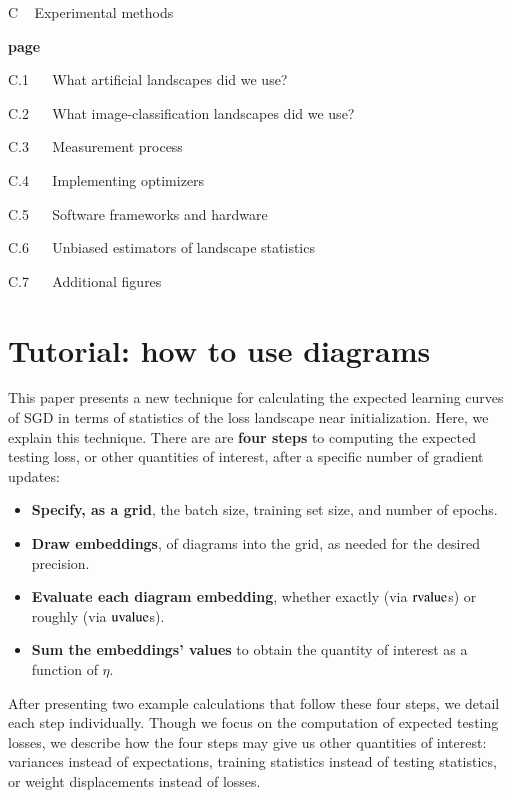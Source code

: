 \documentclass[anon,12pt]{colt2021} %
\newcommand{\uvalue}{\text{\textnormal{uvalue}}}
\newcommand{\rvalue}{\text{\textnormal{rvalue}}}
\begin{document}
        {\bf
        \par\noindent C ~ Experimental methods}                                 \hfill {\bf page \pageref{appendix:experiments}}
        \par\indent     C.1 ~~ What artificial landscapes did we use?           \hfill \pageref{appendix:artificial}  
        \par\indent     C.2 ~~ What image-classification landscapes did we use? \hfill \pageref{appendix:natural}
        \par\indent     C.3 ~~ Measurement process                              \hfill \pageref{appendix:measure}
        \par\indent     C.4 ~~ Implementing optimizers                          \hfill \pageref{appendix:optimizers}
        \par\indent     C.5 ~~ Software frameworks and hardware                 \hfill \pageref{appendix:frameworks}
        \par\indent     C.6 ~~ Unbiased estimators of landscape statistics      \hfill \pageref{appendix:bessel}
        \par\indent     C.7 ~~ Additional figures                               \hfill \pageref{appendix:figures}
 
\newpage
\section{Tutorial: how to use diagrams}                \label{appendix:tutorial}
    This paper presents a new technique for calculating the expected learning
    curves of SGD in terms of statistics of the loss landscape near
    initialization.  Here, we explain this technique.
    There are are {\bf four steps} to computing the expected testing loss, or
    other quantities of interest, after a specific number of gradient updates: 
    \begin{itemize}
        \item {\bf Specify, as a grid}, the batch size, training set
            size, and number of epochs. 
        \item {\bf Draw embeddings}, of diagrams into the
            grid, as needed for the desired precision.
        \item {\bf Evaluate each diagram embedding}, whether exactly
            (via $\rvalue$s)
            or roughly
            (via $\uvalue$s).
        \item {\bf Sum the embeddings' values} to obtain the quantity of
              interest as a function of $\eta$.
    \end{itemize}
    \noindent
    After presenting two example calculations that follow these four steps, we
    detail each step individually.  Though we focus on the computation of
    expected testing losses, we describe how the four steps may give us other
    quantities of interest: variances instead of expectations, training
    statistics instead of testing statistics, or weight displacements instead
    of losses.  
\end{document}

